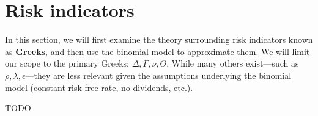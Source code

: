 \section{Risk indicators}

In this section, we will first examine the theory surrounding risk indicators known as \textbf{Greeks}, and then use the binomial model to approximate them. We will limit our scope to the primary Greeks: $\Delta, \Gamma, \nu, \Theta$. While many others exist—such as $\rho, \lambda, \epsilon$—they are less relevant given the assumptions underlying the binomial model (constant risk-free rate, no dividends, etc.).

TODO




